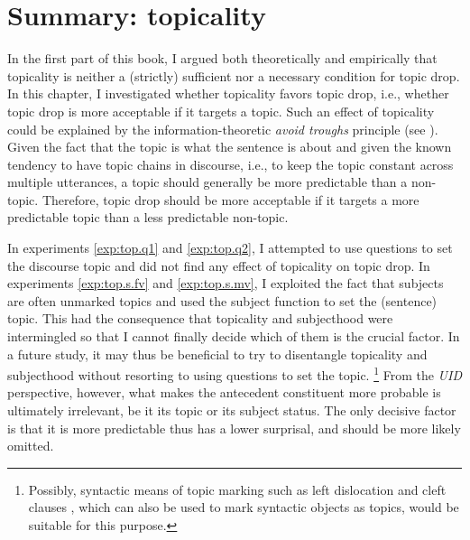 \section{Summary: topicality}
In the first part of this book, I argued both theoretically and empirically that topicality is neither a (strictly) sufficient nor a necessary condition for topic drop.
In this chapter, I investigated whether topicality favors topic drop, i.e., whether topic drop is more acceptable if it targets a topic.
Such an effect of topicality could be explained by the information-theoretic \textit{avoid troughs} principle (see ).
Given the fact that the topic is what the sentence is about and given the known tendency to have topic chains in discourse, i.e., to keep the topic constant across multiple utterances, a topic should generally be more predictable than a non-topic. 
Therefore, topic drop should be more acceptable if it targets a more predictable topic than a less predictable non-topic. 

In experiments \ref*{exp:top.q1} and \ref*{exp:top.q2}, I attempted to use questions to set the discourse topic  and did not find any effect of topicality on topic drop.
In experiments \ref*{exp:top.s.fv} and \ref*{exp:top.s.mv}, I exploited the fact that subjects are often unmarked topics and used the subject function to set the (sentence) topic.
This had the consequence that topicality and subjecthood were intermingled so that I cannot finally decide which of them is the crucial factor.
In a future study, it may thus be beneficial to try to disentangle topicality and subjecthood without resorting to using questions to set the topic.%
\footnote{Possibly, syntactic means of topic marking such as left dislocation  and cleft clauses \citep[see, e.g.,][33--34]{musan2017}, which can also be used to mark syntactic objects as topics, would be suitable for this purpose.}
%
From the \textit{UID} perspective, however, what makes the antecedent constituent  more probable is ultimately irrelevant, be it its topic or its subject status.
The only decisive factor is that it is more predictable thus has a lower surprisal, and should be more likely omitted. 

